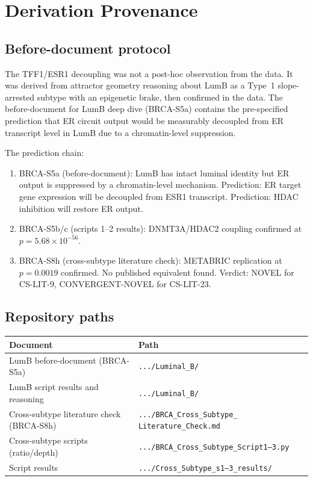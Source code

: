 \documentclass[12pt, a4paper]{article}
\begin{document}
\section{Derivation Provenance}

\subsection{Before-document protocol}

The TFF1/ESR1 decoupling was not a post-hoc
observation from the data. It was derived from
attractor geometry reasoning about LumB as a
Type~1 slope-arrested subtype with an epigenetic
brake, then confirmed in the data. The before-document
for LumB deep dive (BRCA-S5a) contains the
pre-specified prediction that ER circuit output
would be measurably decoupled from ER transcript
level in LumB due to a chromatin-level suppression.

\noindent
The prediction chain:
\begin{enumerate}[noitemsep]
  \item BRCA-S5a (before-document): LumB has intact
        luminal identity but ER output is suppressed
        by a chromatin-level mechanism. Prediction:
        ER target gene expression will be decoupled
        from ESR1 transcript. Prediction: HDAC
        inhibition will restore ER output.
  \item BRCA-S5b/c (scripts 1--2 results): DNMT3A/HDAC2
        coupling confirmed at $p=5.68\times10^{-56}$.
  \item BRCA-S8h (cross-subtype literature check):
        METABRIC replication at $p=0.0019$ confirmed.
        No published equivalent found. Verdict: NOVEL
        for CS-LIT-9, CONVERGENT-NOVEL for CS-LIT-23.
\end{enumerate}

\subsection{Repository paths}

\begin{center}
\begin{tabular}{ll}
\toprule
\textbf{Document} & \textbf{Path} \\
\midrule
LumB before-document (BRCA-S5a)
& \texttt{.../Luminal\_B/} \\
LumB script results and reasoning
& \texttt{.../Luminal\_B/} \\
Cross-subtype literature check (BRCA-S8h)
& \texttt{.../BRCA\_Cross\_Subtype\_}
  \texttt{Literature\_Check.md} \\
Cross-subtype scripts (ratio/depth)
& \texttt{.../BRCA\_Cross\_Subtype\_Script1--3.py} \\
Script results
& \texttt{.../Cross\_Subtype\_s1--3\_results/} \\
\bottomrule
\end{tabular}
\end{center}
\end{document}
